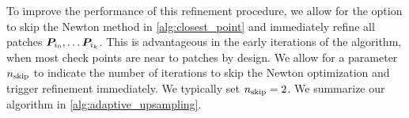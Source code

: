 To improve the performance of this refinement procedure, we allow for the option to skip the Newton method in \cref{alg:closest_point} and immediately refine all patches ${\bm{P}}_{i_0},\hdots {\bm{P}}_{i_k}$.
This is advantageous in the early iterations of the algorithm, when most check points are near to patches by design.
We allow for a parameter $n_{\mathrm{skip}}$ to indicate the number of iterations to skip the Newton optimization and trigger refinement immediately.
We typically set $n_{\mathrm{skip}}=2$.
We summarize our algorithm in \cref{alg:adaptive_upsampling}.




